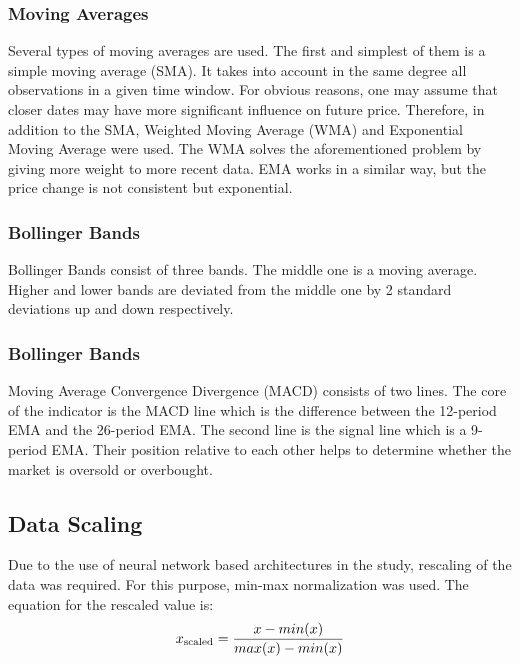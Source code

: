 \documentclass[11pt]{article} %
\begin{document}
\subsubsection{Moving Averages}
Several types of moving averages are used. The first and simplest of them is a simple moving average (SMA). It takes into account in the same degree all observations in a given time window. For obvious reasons, one may assume that closer dates may have more significant influence on future price. Therefore, in addition to the SMA, Weighted Moving Average (WMA) and Exponential Moving Average were used. The WMA solves the aforementioned problem by giving more weight to more recent data. EMA works in a similar way, but the price change is not consistent but exponential.

\subsubsection{Bollinger Bands}
Bollinger Bands consist of three bands. The middle one is a moving average. Higher and lower bands are deviated from the middle one by 2 standard deviations up and down respectively. 

\subsubsection{Bollinger Bands}
Moving Average Convergence Divergence (MACD) consists of two lines. The core of the indicator is the MACD line which is the difference between the 12-period EMA and the 26-period EMA. The second line is the signal line which is a 9-period EMA. Their position relative to each other helps to determine whether the market is oversold or overbought.


\subsection{Data Scaling}
Due to the use of neural network based architectures in the study, rescaling of the data was required. For this purpose, min-max normalization was used. The equation for the rescaled value is: 
\[ x\textsubscript{scaled} = \frac{x - min(x)}{max(x) - min(x)} \]
\end{document}
